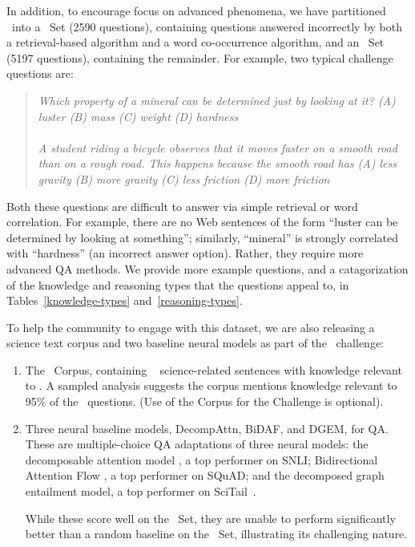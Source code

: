 In addition, to encourage focus on advanced phenomena, we have partitioned \ASC~into a \Challenge~Set (2590 questions), containing questions answered incorrectly by both a retrieval-based algorithm and a word co-occurrence algorithm, and an \Additional~Set (5197 questions), containing the remainder. For example, two typical challenge questions are:

\begin{quote}
  {\it Which property of a mineral can be determined just by looking at it? (A) luster {\bfit [correct]} (B) mass (C) weight (D) hardness} \\
  \\
 {\it A student riding a bicycle observes that it moves faster on a smooth road than on a rough road. This happens because the smooth road has (A) less gravity (B) more gravity (C) less friction {\bfit [correct]} (D) more friction}
\end{quote}

Both these questions are difficult to answer via simple retrieval or word correlation. For example, there are no Web sentences of the form ``luster can be determined by looking at something''; similarly, ``mineral'' is strongly correlated with ``hardness'' (an incorrect answer option). Rather, they require more advanced QA methods. We provide more example questions, and a catagorization of the knowledge and reasoning types that the questions appeal to, in Tables~\ref{knowledge-types} and~\ref{reasoning-types}.

To help the community to engage with this dataset, we are also releasing a science text corpus and two baseline neural models as part of the \ASC~challenge:

\begin{enumerate}
\item The \ASC~Corpus, containing ~
  science-related sentences with knowledge relevant to \ASC.
  A sampled analysis suggests the corpus mentions knowledge relevant to 
   95\% of the \Challenge~questions. (Use of the Corpus for the Challenge is optional).
\item Three neural baseline models, DecompAttn, BiDAF, and DGEM, for QA. These are multiple-choice QA adaptations of three neural models: the decomposable attention model \cite{parikh2016decomposable}, a top performer on SNLI; Bidirectional Attention Flow \cite{Seo2016BidirectionalAF}, a top performer on SQuAD; and the decomposed graph entailment model, a top performer on SciTail~\cite{khot2018scitail}.

While these score well on the \Additional~Set, they are unable to perform significantly better than a random baseline on the \Challenge~Set, illustrating its challenging nature.

\end{enumerate}

